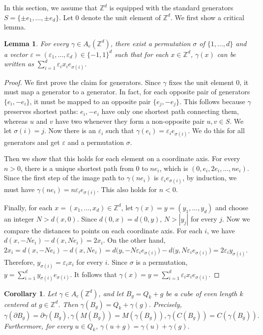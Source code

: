 \documentclass[11pt, reqno, a4paper]{amsart}
\theoremstyle{plain}
\newtheorem{lemma}[theorem]{Lemma}
\newtheorem{corollary}[theorem]{Corollary}
\theoremstyle{definition}
\theoremstyle{remark}
\begin{document}
 
In this section, we assume that $\mathbb{Z}^d$ is equipped with the standard generators $S=\{\pm e_1,\ldots,\pm e_d\}$. Let $0$ denote the unit element of $\mathbb{Z}^d$. We first show a critical lemma.
\begin{lemma}\label{Ae}
For every 
$\gamma\in A_e(\mathbb{Z}^d)$, there exist a permutation $\sigma$ of $\{1,\dots,d\}$ and a vector $\varepsilon=(\varepsilon_1,\ldots,\varepsilon_d)\in\{-1,1\}^d$ such that for each $x\in \mathbb{Z}^d$, $\gamma(x) $ can be written as $\sum_{i=1}^d \varepsilon_i x_i e_{\sigma(i)}.$
\end{lemma} 
\begin{proof}
  We first prove the claim for generators. Since $\gamma$ fixes the unit element $0$, it must map a generator to a generator.  In fact, for each opposite pair of generators $\{e_i,-e_i\}$, it must be mapped to an opposite pair $\{e_j,-e_j\}$. This follows because $\gamma$ preserves shortest paths: $e_i,-e_i$ have only one shortest path connecting them, whereas $u$ and $v$ have two whenever they form a non-opposite pair $u,v\in S$. We let $\sigma(i)=j$. Now there is an $\varepsilon_i$ such that $\gamma(e_i)=\varepsilon_ie_{\sigma(i)}$. We do this for all generators and get $\varepsilon$ and a permutation $\sigma$. 
  
  Then we show that this holds for each element on a coordinate axis. For every  $n>0$, there is a unique shortest path from $0$ to $ne_i$, which is $(0,e_i,2e_i,\dots,ne_i)$. Since the first step of the image path to $\gamma (ne_i)$ is $\varepsilon_ie_{\sigma(i)}$, by induction, we must have $ \gamma(ne_i)=n\varepsilon_i e_{\sigma(i)}$. This also holds for $n<0$.

  Finally, for each $x=(x_1,\ldots,x_d)\in \mathbb{Z}^d$, let $\gamma(x)=y=(y_1,\dots,y_d)$ and choose an integer $N>d(x,0)$. Since $d(0,x)=d(0,y)$, $N>|y_j|$ for every $j$. Now we compare the distances to points on each coordinate axis. For each $i$, we have
$d(x,-Ne_i)-d(x,Ne_i)=2x_i$.
On the other hand, $2x_i=d(x,-Ne_i)-d(x,Ne_i)=d(y,-N\varepsilon_i e_{\sigma(i)}\bigr)
  -d(y,N\varepsilon_i e_{\sigma(i)}\bigr)=2\varepsilon_i y_{\sigma(i)}.$
Therefore, $y_{\sigma(i)}=\varepsilon_i x_i$ for every $i$. Since $\sigma$ is a permutation, $y
=\sum_{i=1}^d y_{\sigma(i)}e_{\sigma(i)}$. It follows that
$\gamma(x)=y
=\sum_{i=1}^d \varepsilon_i x_i e_{\sigma(i)}.$
\end{proof}
\begin{corollary}\label{cube}
Let $\gamma\in A_e(\mathbb{Z}^d)$, and let
$B_g=Q_k+g$ be a cube of even length $k$ centered at
$g\in\mathbb{Z}^d$. Then $\gamma(B_g)=Q_k+\gamma(g).$ Precisely, $\gamma(\partial B_g)=\partial\gamma(B_g),
\gamma(M(B_g))=M(\gamma(B_g)),\gamma(C(B_g))=C(\gamma(B_g)).$
Furthermore, for every $u\in Q_k$,
$\gamma(u+g)=\gamma(u)+\gamma(g).$
\end{corollary}
\end{document}

